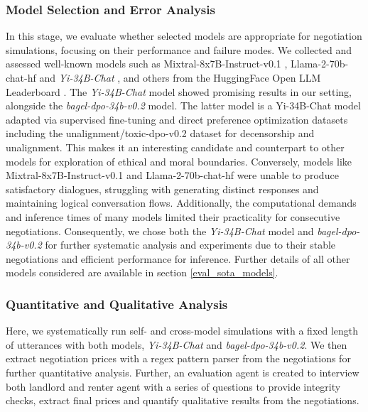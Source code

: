 \documentclass[runningheads]{llncs}
\begin{document}
\subsubsection{Model Selection and Error Analysis} In this stage, we evaluate whether selected models are appropriate for negotiation simulations, focusing on their performance and failure modes. We collected and assessed well-known models such as Mixtral-8x7B-Instruct-v0.1 \cite{jiang_mixtral_2024}, Llama-2-70b-chat-hf \cite{touvron_llama_2023} and \textit{Yi-34B-Chat} \cite{ai_yi_2024}, and others from the HuggingFace Open LLM Leaderboard \cite{noauthor_open_nodate}. The \textit{Yi-34B-Chat} model showed promising results in our setting, alongside the \textit{bagel-dpo-34b-v0.2} \cite{noauthor_jondurbinbagel-dpo-34b-v02_2024} model. The latter model is a Yi-34B-Chat model adapted via supervised fine-tuning and direct preference optimization datasets including the unalignment/toxic-dpo-v0.2 \cite{noauthor_unalignmenttoxic-dpo-v02_2024} dataset for decensorship and unalignment. This makes it an interesting candidate and counterpart to other models for exploration of ethical and moral boundaries. Conversely, models like Mixtral-8x7B-Instruct-v0.1 \cite{jiang_mixtral_2024} and Llama-2-70b-chat-hf \cite{touvron_llama_2023} were unable to produce satisfactory dialogues, struggling with generating distinct responses and maintaining logical conversation flows. Additionally, the computational demands and inference times of many models limited their practicality for consecutive negotiations. Consequently, we chose both the \textit{Yi-34B-Chat} model and \textit{bagel-dpo-34b-v0.2} for further systematic analysis and experiments due to their stable negotiations and efficient performance for inference. Further details of all other models considered are available in section \ref{eval_sota_models}.

\subsubsection{Quantitative and Qualitative Analysis} Here, we systematically run self- and cross-model simulations with a fixed length of utterances with both models, \textit{Yi-34B-Chat} and \textit{bagel-dpo-34b-v0.2}. We then extract negotiation prices with a regex pattern parser from the negotiations for further quantitative analysis. Further, an evaluation agent is created to interview both landlord and renter agent with a series of questions to provide integrity checks, extract final prices and quantify qualitative results from the negotiations.
\end{document}
